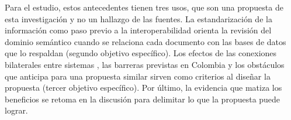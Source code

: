 Para el estudio, estos antecedentes tienen tres usos, que son una propuesta de esta investigación y no un hallazgo de las fuentes. La estandarización de la información como paso previo a la interoperabilidad \parencite[p.~20]{pinzonarana2025caracterizacion} orienta la revisión del dominio semántico cuando se relaciona cada documento con las bases de datos que lo respaldan (segundo objetivo específico). Los efectos de las conexiones bilaterales entre sistemas \parencite[p.~54]{leosk2021drivers}, las barreras previstas en Colombia \parencite[p.~71]{moralesmoreno2015interoperability} y los obstáculos que \textcite[p.~67]{molina2025propuesta} anticipa para una propuesta similar sirven como criterios al diseñar la propuesta (tercer objetivo específico). Por último, la evidencia que matiza los beneficios se retoma en la discusión para delimitar lo que la propuesta puede lograr.
